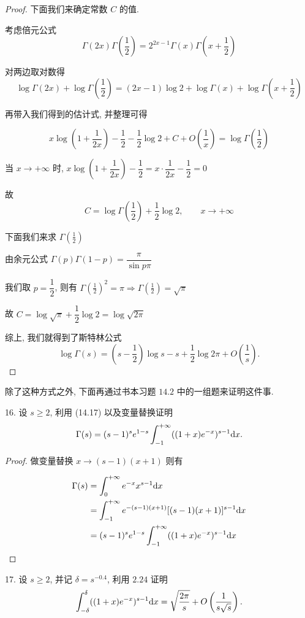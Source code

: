 \begin{proof}
	下面我们来确定常数 $C$ 的值.

	考虑倍元公式
	$$\Gamma(2x)\Gamma(\frac 1 2)=2^{2x-1}\Gamma(x)\Gamma(x+\frac 1 2)$$

	对两边取对数得
	$$\log \Gamma(2x) + \log \Gamma(\frac 1 2)=(2x-1)\log 2 + \log \Gamma(x)+ \log \Gamma(x+\frac 1 2)$$

	再带入我们得到的估计式, 并整理可得

	$$x\log (1+\dfrac 1 {2x})-\dfrac 1 2 - \dfrac 1 2 \log 2 + C +O\left(\dfrac 1 x \right)=\log \Gamma(\dfrac 1 2)$$

	当 $x\to +\infty$ 时, $x\log (1+\dfrac 1 {2x})-\dfrac 1 2=x \cdot \dfrac 1 {2x}-\dfrac 1 2=0$

	故
	$$C=\log\Gamma(\dfrac 1 2) + \dfrac 1 2 \log 2,\qquad x\to +\infty$$

	下面我们来求 $\Gamma(\frac 1 2)$

	由余元公式 $\Gamma(p)\Gamma(1-p)=\dfrac{\pi}{\sin p\pi}$

	我们取 $p=\dfrac{1}{2}$, 则有 $\Gamma(\frac 1 2)^2=\pi \Rightarrow \Gamma(\frac 1 2)=\sqrt{\pi}$

	故 $C=\log \sqrt{\pi}+\dfrac 1 2\log 2=\log \sqrt{2\pi}$

	综上, 我们就得到了斯特林公式 $$\log \Gamma(s)=(s-\frac 1 2)\log s - s + \frac 1 2 \log 2 \pi +O\left(\frac 1 s\right).$$
\end{proof}


除了这种方式之外, 下面再通过书本习题 $14.2$ 中的一组题来证明这件事.

16. 设 $s \geqslant 2$, 利用 (14.17) 以及变量替换证明
$$\Gamma(s)=(s-1)^s e^{1-s}\int_{-1}^{+\infty}((1+x)e^{-x})^{s-1} \text {d} x.$$

\begin{proof}
	做变量替换 $x \to (s-1)(x+1)$ 则有

	\begin{equation*}
		\begin{aligned}
			\Gamma(s) &= \int_{0}^{+\infty} e^{-x}x^{s-1} \text {d} x \\
			&=  \int_{-1}^{+\infty}e^{-(s-1)(x+1)}[(s-1)(x+1)]^{s-1} \text {d} x \\
			&= (s-1)^s e^{1-s} \int_{-1}^{+\infty}((1+x)e^{-x})^{s-1} \text {d} x
		\end{aligned}
	\end{equation*}

\end{proof}

17. 设 $s \geqslant 2$, 并记 $\delta = s^{-0.4}$, 利用 $2.24$ 证明
$$\int_{-\delta}^{\delta} ((1+x)e^{-x})^{s-1} \text {d} x = \sqrt{\frac{2\pi}{s}} + O\left(\frac{1}{s\sqrt{s}}\right).$$

